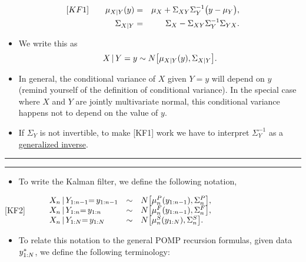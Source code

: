 \documentclass[]{article}
\providecommand{\tightlist}{%
  \setlength{\itemsep}{0pt}\setlength{\parskip}{0pt}}
\begin{document}
\begin{eqnarray}
{[}KF1{]}\quad\quad \mu_{X|Y}(y) &=& \mu_X + \Sigma_{XY}\Sigma_Y^{-1}\big(y-\mu_Y\big),
\\
\Sigma_{X|Y} &=& \Sigma_X - \Sigma_{XY}\Sigma_Y^{-1}\Sigma_{YX}.
\end{eqnarray}

\begin{itemize}
\item
  We write this as
  \[ X{\, | \,} Y=y \sim N\big[\mu_{X|Y}(y),\Sigma_{X|Y}\big]. \]
\item
  In general, the conditional variance of \(X\) given \(Y=y\) will
  depend on \(y\) (remind yourself of the definition of conditional
  variance). In the special case where \(X\) and \(Y\) are jointly
  multivariate normal, this conditional variance happens not to depend
  on the value of \(y\).
\item
  If \(\Sigma_Y\) is not invertible, to make {[}KF1{]} work we have to
  interpret \(\Sigma_Y^{-1}\) as a
  \href{https://en.wikipedia.org/wiki/Generalized_inverse}{generalized
  inverse}.
\end{itemize}

\begin{center}\rule{0.5\linewidth}{\linethickness}\end{center}

\begin{center}\rule{0.5\linewidth}{\linethickness}\end{center}

\begin{itemize}
\tightlist
\item
  To write the Kalman filter, we define the following notation,
\end{itemize}


{[}KF2{]}
\(\quad\quad \begin{array}{lcl} X_{n}{\, | \,} Y_{1:n-1}{=\,} y_{1:n-1} &\sim& N\big[ \mu_{n}^P(y_{1:n-1}),\Sigma_n^P\big], \\ X_n{\, | \,} Y_{1:n}{=\,} y_{1:n} &\sim& N\big[ \mu_n^F(y_{1:n-1}),\Sigma_n^F\big], \\ X_n{\, | \,} Y_{1:N}{=\,} y_{1:N} &\sim& N\big[ \mu_n^S(y_{1:N}),\Sigma_n^S\big]. \end{array}\)

\begin{itemize}
\tightlist
\item
  To relate this notation to the general POMP recursion formulas, given
  data \(y_{1:N}^*\), we define the following terminology:
\end{itemize}
\end{document}
